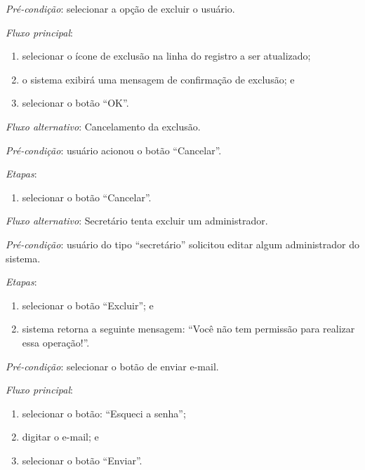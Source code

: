 \vspace{0.7cm}

\noindent \textit{Pré-condição}: selecionar a opção de excluir o usuário.

\noindent \textit{Fluxo principal}:

\begin{enumerate}
    \item selecionar o ícone de exclusão na linha do registro a ser atualizado;
    \item o sistema exibirá uma mensagem de confirmação de exclusão; e
    \item selecionar o botão ``OK''.
\end{enumerate}

\noindent \textit{Fluxo alternativo}: Cancelamento da exclusão.

\noindent \textit{Pré-condição}: usuário acionou o botão ``Cancelar''.

\noindent \textit{Etapas}:

\begin{enumerate}
    \item selecionar o botão ``Cancelar''.
\end{enumerate}


\noindent \textit{Fluxo alternativo}: Secretário tenta excluir um administrador.

\noindent \textit{Pré-condição}: usuário do tipo ``secretário'' solicitou editar algum administrador do sistema.

\noindent \textit{Etapas}:

\begin{enumerate}
    \item selecionar o botão ``Excluir''; e
    \item sistema retorna a seguinte mensagem: ``Você não tem permissão para realizar essa operação!''.
\end{enumerate}



\vspace{0.7cm}

\noindent \textit{Pré-condição}: selecionar o botão de enviar e-mail.

\noindent \textit{Fluxo principal}:

\begin{enumerate}
    \item selecionar o botão: ``Esqueci a senha'';
    \item digitar o e-mail; e
    \item selecionar o botão ``Enviar''.
\end{enumerate}

